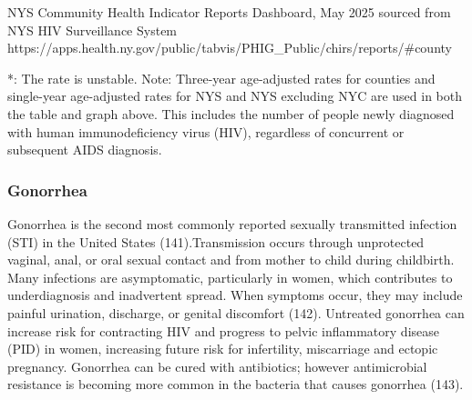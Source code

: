 \documentclass[
  english,
  letterpaper,
]{report}
\begin{document}
\begin{tcolorbox}[enhanced jigsaw, breakable, leftrule=.75mm, title=\textcolor{quarto-callout-note-color}{\faInfo}\hspace{0.5em}{Source}, bottomrule=.15mm, opacityback=0, left=2mm, colback=white, bottomtitle=1mm, coltitle=black, colbacktitle=quarto-callout-note-color!10!white, colframe=quarto-callout-note-color-frame, opacitybacktitle=0.6, toptitle=1mm, titlerule=0mm, arc=.35mm, rightrule=.15mm, toprule=.15mm]

NYS Community Health Indicator Reports Dashboard, May 2025 sourced from
NYS HIV Surveillance System
https://apps.health.ny.gov/public/tabvis/PHIG\_Public/chirs/reports/\#county

\end{tcolorbox}

\begin{tcolorbox}[enhanced jigsaw, breakable, leftrule=.75mm, title=\textcolor{quarto-callout-note-color}{\faInfo}\hspace{0.5em}{Note}, bottomrule=.15mm, opacityback=0, left=2mm, colback=white, bottomtitle=1mm, coltitle=black, colbacktitle=quarto-callout-note-color!10!white, colframe=quarto-callout-note-color-frame, opacitybacktitle=0.6, toptitle=1mm, titlerule=0mm, arc=.35mm, rightrule=.15mm, toprule=.15mm]

*: The rate is unstable. Note: Three-year age-adjusted rates for
counties and single-year age-adjusted rates for NYS and NYS excluding
NYC are used in both the table and graph above. This includes the number
of people newly diagnosed with human immunodeficiency virus (HIV),
regardless of concurrent or subsequent AIDS diagnosis.

\end{tcolorbox}

\subsubsection{Gonorrhea}\label{gonorrhea}

Gonorrhea is the second most commonly reported sexually transmitted
infection (STI) in the United States (141).Transmission occurs through
unprotected vaginal, anal, or oral sexual contact and from mother to
child during childbirth. Many infections are asymptomatic, particularly
in women, which contributes to underdiagnosis and inadvertent spread.
When symptoms occur, they may include painful urination, discharge, or
genital discomfort (142). Untreated gonorrhea can increase risk for
contracting HIV and progress to pelvic inflammatory disease (PID) in
women, increasing future risk for infertility, miscarriage and ectopic
pregnancy. Gonorrhea can be cured with antibiotics; however
antimicrobial resistance is becoming more common in the bacteria that
causes gonorrhea (143).
\end{document}

